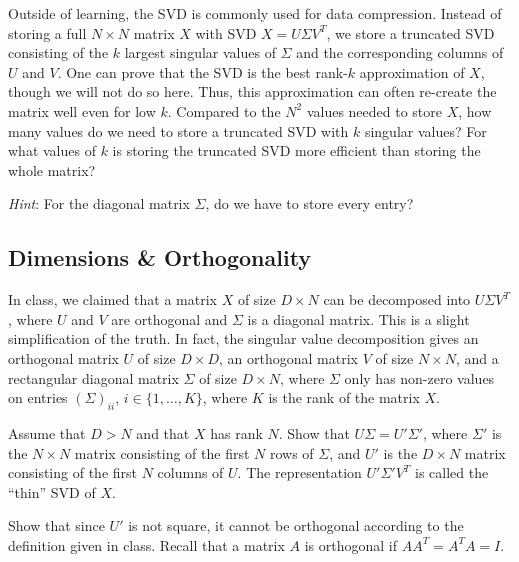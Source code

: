 \problem[3] Outside of learning, the SVD is commonly used for data compression. Instead of storing a full $N \times N$ matrix $X$ with SVD $X = U\Sigma V^T$, we store a truncated SVD consisting of the $k$ largest singular values of $\Sigma$ and the corresponding columns of $U$ and $V$. One can prove that the SVD is the best rank-$k$ approximation of $X$, though we will not do so here. Thus, this approximation can often re-create the matrix well even for low $k$. Compared to the $N^2$ values needed to store $X$, how many values do we need to store a truncated SVD with $k$ singular values? For what values of $k$ is storing the truncated SVD more efficient than storing the whole matrix?

\textit{Hint}: For the diagonal matrix $\Sigma$, do we have to store every entry?

\begin{solution}
\end{solution}

\subsection{Dimensions \& Orthogonality} In class, we claimed that a matrix $X$ of size $D \times N$ can be decomposed into $U\Sigma V^T$, where $U$ and $V$ are orthogonal and $\Sigma$ is a diagonal matrix. This is a slight simplification of the truth. In fact, the singular value decomposition gives an orthogonal matrix $U$ of size $D \times D$, an orthogonal matrix $V$ of size $N \times N$, and a rectangular diagonal matrix $\Sigma$ of size $D \times N$, where $\Sigma$ only has non-zero values on entries $(\Sigma)_{ii}$, $i \in \{1, \ldots, K\}$, where $K$ is the rank of the matrix $X$. 

\problem[3]Assume that $D > N$ and that $X$ has rank $N$. Show that $U\Sigma = U'\Sigma'$, where $\Sigma'$ is the $N \times N$ matrix consisting of the first $N$ rows of $\Sigma$, and $U'$ is the $D \times N$ matrix consisting of the first $N$ columns of $U$. The representation $U'\Sigma' V^T$ is called the ``thin'' SVD of $X$.

\begin{solution}

\end{solution}

\problem[3] Show that since $U'$ is not square, it cannot be orthogonal according to the definition given in class. Recall that a matrix $A$ is orthogonal if $A A^T = A^T A = I$.

\begin{solution}
\end{solution} 

